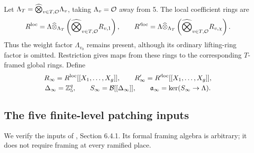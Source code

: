 \documentclass[11pt,a4paper]{article}
\theoremstyle{definition}\newtheorem{definition}[theorem]{Definition}
\theoremstyle{remark}\newtheorem*{remark}{Remark}
\begin{document}
Let $\Lambda_T=\widehat\bigotimes_{v\in T,\mathcal O}\Lambda_v$, taking
$\Lambda_v=\mathcal O$ away from 5. The local coefficient rings are
\[
R^{\mathrm{loc}}=
\Lambda\widehat\otimes_{\Lambda_T}
 \left(\widehat\bigotimes_{v\in T,\mathcal O}R_{v,1}\right),\qquad
R^{\prime\mathrm{loc}}=
\Lambda\widehat\otimes_{\Lambda_T}
 \left(\widehat\bigotimes_{v\in T,\mathcal O}R_{v,\chi}\right).
\]
Thus the weight factor $\Lambda_{v_0}$ remains present, although its ordinary
lifting-ring factor is omitted. Restriction gives maps from these rings to
the corresponding $T$-framed global rings. Define
\begin{gather*}
R_\infty=R^{\mathrm{loc}}[[X_1,\ldots,X_g]],\qquad
R'_\infty=R^{\prime\mathrm{loc}}[[X_1,\ldots,X_g]],\\
\Delta_\infty=\mathbb Z_5^q,\qquad
S_\infty=\mathcal B[[\Delta_\infty]],\qquad
\mathfrak a_\infty=\ker(S_\infty\to\Lambda).
\end{gather*}

\subsection{The five finite-level patching inputs}

We verify the inputs of \cite{ACC}, Section 6.4.1. Its formal framing algebra
is arbitrary; it does not require framing at every ramified place.
\end{document}
